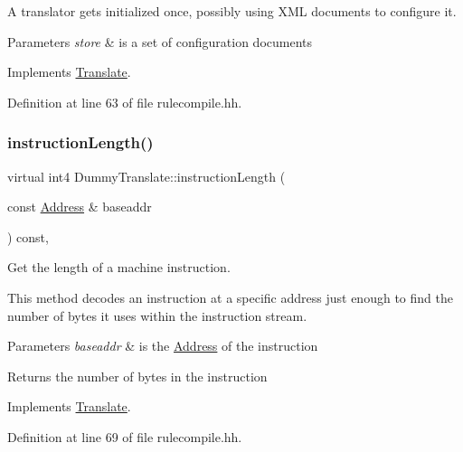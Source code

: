 A translator gets initialized once, possibly using X\+ML documents to configure it. 
\begin{DoxyParams}{Parameters}
{\em store} & is a set of configuration documents \\
\hline
\end{DoxyParams}


Implements \mbox{\hyperlink{class_translate_af8e71e9a9477e9a91be400ecca565df5}{Translate}}.



Definition at line 63 of file rulecompile.\+hh.

\mbox{\label{class_dummy_translate_aaf7ead6c5f833e5558319725ad66fe28}} 
\subsubsection{\texorpdfstring{instructionLength()}{instructionLength()}}
{\footnotesize\ttfamily virtual int4 Dummy\+Translate\+::instruction\+Length (\begin{DoxyParamCaption}\item[{const \mbox{\hyperlink{class_address}{Address}} \&}]{baseaddr }\end{DoxyParamCaption}) const\hspace{0.3cm}{\ttfamily [inline]}, {\ttfamily [virtual]}}



Get the length of a machine instruction. 

This method decodes an instruction at a specific address just enough to find the number of bytes it uses within the instruction stream. 
\begin{DoxyParams}{Parameters}
{\em baseaddr} & is the \mbox{\hyperlink{class_address}{Address}} of the instruction \\
\hline
\end{DoxyParams}
\begin{DoxyReturn}{Returns}
the number of bytes in the instruction 
\end{DoxyReturn}


Implements \mbox{\hyperlink{class_translate_aa7139376886fccfdcda529fc74f7b382}{Translate}}.



Definition at line 69 of file rulecompile.\+hh.

